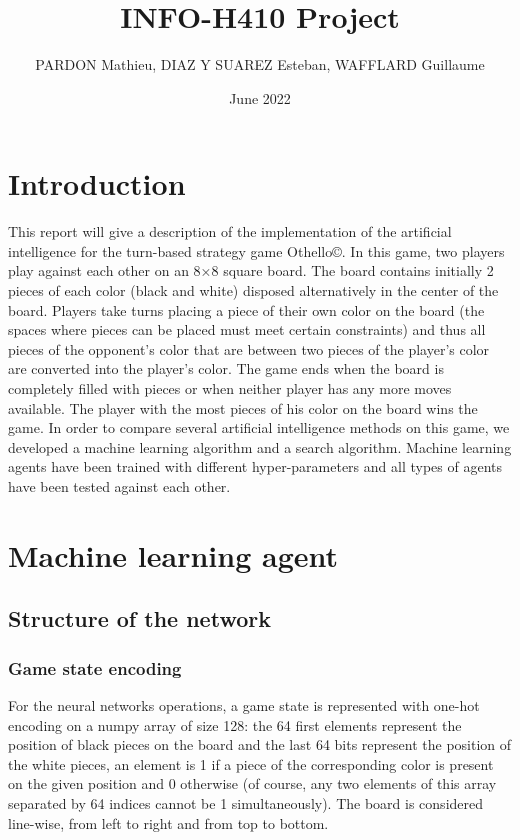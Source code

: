 \documentclass{article}
\title{INFO-H410 Project}
\author{PARDON Mathieu, DIAZ Y SUAREZ Esteban, WAFFLARD Guillaume}
\date{June 2022}
\begin{document}
\maketitle
\tableofcontents
\clearpage


\section{Introduction}

This report will give a description of the implementation of the artificial intelligence for the turn-based strategy game Othello\copyright. In this game, two players play against each other on an 8×8 square board. The board contains initially 2 pieces of each color (black and white) disposed alternatively in the center of the board. Players take turns placing a piece of their own color on the board (the spaces where pieces can be placed must meet certain constraints) and thus all pieces of the opponent's color that are between two pieces of the player's color are converted into the player's color. The game ends when the board is completely filled with pieces or when neither player has any more moves available. The player with the most pieces of his color on the board wins the game. In order to compare several artificial intelligence methods on this game, we developed a machine learning algorithm and a search algorithm. Machine learning agents have been trained with different hyper-parameters and all types of agents have been tested against each other.

\section{Machine learning agent}

\subsection{Structure of the network}

\subsubsection{Game state encoding}

For the neural networks operations, a game state is represented with one-hot encoding on a numpy array of size 128: the 64 first elements represent the position of black pieces on the board and the last 64 bits represent the position of the white pieces, an element is 1 if a piece of the corresponding color is present on the given position and 0 otherwise (of course, any two elements of this array separated by 64 indices cannot be 1 simultaneously). The board is considered line-wise, from left to right and from top to bottom.
\end{document}
